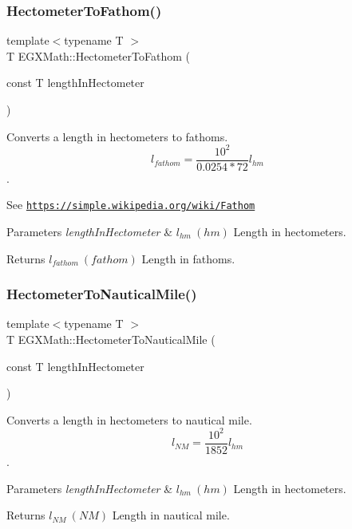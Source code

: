 \subsubsection{\texorpdfstring{Hectometer\+To\+Fathom()}{HectometerToFathom()}}
{\footnotesize\ttfamily template$<$typename T $>$ \\
T E\+G\+X\+Math\+::\+Hectometer\+To\+Fathom (\begin{DoxyParamCaption}\item[{const T}]{length\+In\+Hectometer }\end{DoxyParamCaption})}



Converts a length in hectometers to fathoms. \[ l_{fathom}= \frac{10^{2}}{0.0254 * 72} l_{hm} \]. 

See \href{https://simple.wikipedia.org/wiki/Fathom}{\tt https\+://simple.\+wikipedia.\+org/wiki/\+Fathom} 
\begin{DoxyParams}{Parameters}
{\em length\+In\+Hectometer} & $ l_{hm}\ (hm)$ Length in hectometers. \\
\hline
\end{DoxyParams}
\begin{DoxyReturn}{Returns}
$ l_{fathom}\ (fathom)$ Length in fathoms. 
\end{DoxyReturn}
\mbox{\label{group___e_g_x_math-_conversions-_length_conversions-_s_i-_hectometer-_nautical_ga74e84be72b4e2272d547b5d7e21211dc}} 
\subsubsection{\texorpdfstring{Hectometer\+To\+Nautical\+Mile()}{HectometerToNauticalMile()}}
{\footnotesize\ttfamily template$<$typename T $>$ \\
T E\+G\+X\+Math\+::\+Hectometer\+To\+Nautical\+Mile (\begin{DoxyParamCaption}\item[{const T}]{length\+In\+Hectometer }\end{DoxyParamCaption})}



Converts a length in hectometers to nautical mile. \[ l_{NM}= \frac{10^{2}}{1852} l_{hm} \]. 


\begin{DoxyParams}{Parameters}
{\em length\+In\+Hectometer} & $ l_{hm}\ (hm)$ Length in hectometers. \\
\hline
\end{DoxyParams}
\begin{DoxyReturn}{Returns}
$ l_{NM}\ (NM)$ Length in nautical mile. 
\end{DoxyReturn}
